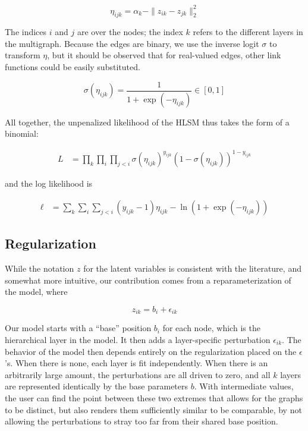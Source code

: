 \documentclass{article}
\begin{document}
\[
\eta_{ijk} = \alpha_k - \|z_{ik} - z_{jk}\|_2^2 %
\]

The indices $i$ and $j$ are over the nodes; the index $k$ refers to the different layers in the multigraph. Because the edges are binary, we use the inverse logit $\sigma$ to transform $\eta$, but it should be observed that for real-valued edges, other link functions could be easily substituted.

\[
\sigma(\eta_{ijk}) = \frac{1}{1+\exp(-\eta_{ijk})} \in [0, 1]
\]

All together, the unpenalized likelihood of the HLSM thus takes the form of a binomial:

\begin{align*}
  L &= \prod_k \prod_{i}\prod_{j<i} \sigma(\eta_{ijk})^{y_{ijk}}(1-\sigma(\eta_{ijk}))^{1-y_{ijk}}
\end{align*}

and the log likelihood is

\begin{align*}
  \ell 	%
 	& = \sum_k \sum_{i} \sum_{j < i} (y_{ijk}-1)\eta_{ijk} - \ln (1+\exp(-\eta_{ijk}))
\end{align*}

\subsection{Regularization}

While the notation $z$ for the latent variables is consistent with the literature, and somewhat more intuitive, our contribution comes from a reparameterization of the model, where

\[
z_{ik} = b_i + \epsilon_{ik}
\]

Our model starts with a ``base'' position $b_i$ for each node, which is the hierarchical layer in the model. It then adds a layer-specific perturbation $\epsilon_{ik}$. The behavior of the model then depends entirely on the regularization placed on the $\epsilon$'s. When there is none, each layer is fit independently. When there is an arbitrarily large amount, the perturbations are all driven to zero, and all $k$ layers are represented identically by the base parameters $b$. With intermediate values, the user can find the point between these two extremes that allows for the graphs to be distinct, but also renders them sufficiently similar to be comparable, by not allowing the perturbations to stray too far from their shared base position.
\end{document}
